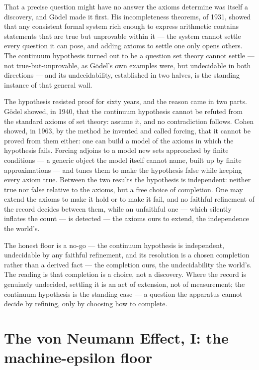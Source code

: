 That a precise question might have no answer the axioms determine was itself a discovery, and G\"odel made it
first. His incompleteness theorems, of 1931, showed that any consistent formal system rich enough to express
arithmetic contains statements that are true but unprovable within it --- the system cannot settle every
question it can pose, and adding axioms to settle one only opens others. The continuum hypothesis turned out to
be a question set theory cannot settle --- not true-but-unprovable, as G\"odel's own examples were, but
undecidable in both directions --- and its undecidability, established in two halves, is the standing instance
of that general wall.

The hypothesis resisted proof for sixty years, and the reason came in two parts. G\"odel showed, in 1940, that
the continuum hypothesis cannot be refuted from the standard axioms of set theory: assume it, and no
contradiction follows. Cohen showed, in 1963, by the method he invented and called forcing, that it cannot be
proved from them either: one can build a model of the axioms in which the hypothesis fails. Forcing adjoins to a
model new sets approached by finite conditions --- a generic object the model itself cannot name, built up by
finite approximations --- and tunes them to make the hypothesis false while keeping every axiom true. Between
the two results the hypothesis is independent: neither true nor false relative to the axioms, but a free choice
of completion. One may extend the axioms to make it hold or to make it fail, and no faithful refinement of the
record decides between them, while an unfaithful one --- which silently inflates the count --- is detected ---
the axioms ours to extend, the independence the world's.

The honest floor is a no-go --- the continuum hypothesis is independent, undecidable by any faithful refinement,
and its resolution is a chosen completion rather than a derived fact --- the completion ours, the
undecidability the world's. The reading is that completion is a
choice, not a discovery. Where the record is genuinely undecided, settling it is an act of extension, not of
measurement; the continuum hypothesis is the standing case --- a question the apparatus cannot decide by
refining, only by choosing how to complete.

\section{The von Neumann Effect, I: the machine-epsilon floor}
\label{se:von-neumann-floor}

